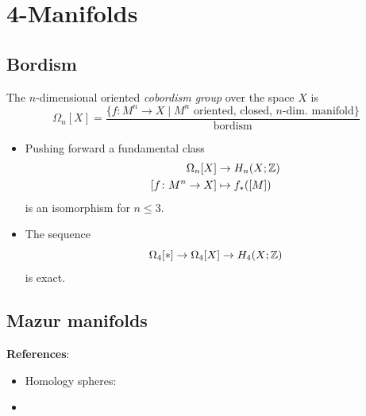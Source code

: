 \chapter{4-Manifolds}

\section{Bordism}

\begin{definition}
	The $n$-dimensional oriented \textit{cobordism group}
	over the space $X$ is
	\begin{equation*}
		\Omega_{n}[X] =
			\frac{ \{ f \colon M^{n} \rightarrow X \mid M^n \textrm{ oriented, closed, } 
			n\textrm{-dim. manifold} \}}{\textrm{bordism}}
	\end{equation*}
\end{definition}

\begin{proposition}
	\begin{itemize}
		\item Pushing forward a fundamental class
		\begin{align*}
			\Omega_n [X] & \rightarrow H_{n}(X ; \mathbb{Z}) \\ 
			[f \colon M^{n} \rightarrow X] & \mapsto f_{*}([M])
		\end{align*}
		is an isomorphism for $n \le 3$.
		
		\item The sequence
		\begin{equation*}
			\Omega_{4}[\ast] \rightarrow \Omega_{4}[X] \rightarrow H_{4}(X ; \mathbb{Z})
		\end{equation*}
		is exact.
	\end{itemize}
\end{proposition}


\section{Mazur manifolds}

\textbf{References}:
\begin{itemize}
	\item Homology spheres: \citep{saveliev2013invariants}
	\item \citep{akbulut1979mazur}
\end{itemize}


